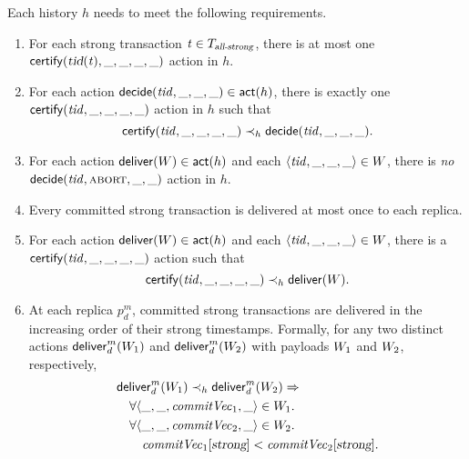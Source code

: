 Each history $h$ needs to meet the following requirements.
\begin{enumerate}[(R1)]
  \item \label{tcs-requirement:certify-once}
    For each strong transaction $\mathit{t} \in T_{\textsl{all-strong}}$,
    there is at most one ${\sf certify}(\textsl{tid}(\mathit{t}), \_, \_, \_, \_)$
    action in $h$.
  \item \label{tcs-requirement:decide-once}
    For each action ${\sf decide}(\mathit{tid}, \_, \_, \_) \in {\sf act}(h)$,
    there is exactly one ${\sf certify}(\mathit{tid}, \_, \_, \_, \_)$ action in $h$
    such that
    \[
      {\sf certify}(\mathit{tid}, \_, \_, \_, \_)
        \prec_{h} {\sf decide}(\mathit{tid}, \_, \_, \_).
    \]
  \item \label{tcs-requirement:abort-cannot-deliver}
    For each action ${\sf deliver}(W) \in {\sf act}(h)$
    and each $\langle \mathit{tid}, \_, \_, \_ \rangle \in W$,
    there is \emph{no} ${\sf decide}(\mathit{tid}, \textsc{abort}, \_, \_)$ action in $h$.
  \item \label{tcs-requirement:deliver-once}
    Every committed strong transaction is delivered at most once to each replica.
  \item \label{tcs-requirement:certify-before-deliver}
    For each action ${\sf deliver}(W) \in {\sf act}(h)$
    and each $\langle \mathit{tid}, \_, \_, \_ \rangle \in W$,
    there is a ${\sf certify}(\mathit{tid}, \_, \_, \_, \_)$ action such that
    \[
      {\sf certify}(\mathit{tid}, \_, \_, \_, \_) \prec_{h} {\sf deliver}(W).
    \]
  \item \label{tcs-requirement:deliver-order}
    At each replica $p^{m}_{d}$, committed strong transactions are delivered
    in the increasing order of their strong timestamps.
    Formally, for any two distinct actions
    ${\sf deliver}^{m}_{d}(W_{1})$ and ${\sf deliver}^{m}_{d}(W_{2})$
    with payloads $W_{1}$ and $W_{2}$, respectively,
    \begin{align*}
      &\intdeliver^{m}_{d}(\payload_{1}) \prec_{h} \intdeliver^{m}_{d}(\payload_{2}) \implies \\
        &\quad \forall \langle \_, \_, \commitvc_{1}, \_ \rangle \in \payload_{1}.\;\\
        &\quad \forall \langle \_, \_, \commitvc_{2}, \_ \rangle \in \payload_{2}.\; \\
          &\qquad \commitvc_{1}[\strongentry] < \commitvc_{2}[\strongentry].
    \end{align*}
\end{enumerate}

